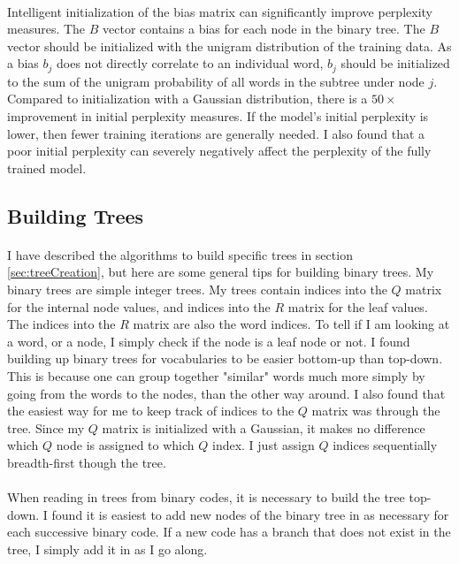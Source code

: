 \documentclass[12pt]{ociamthesis}  %
\begin{document}
\paragraph{}
Intelligent initialization of the bias matrix can significantly improve perplexity measures. The $B$ vector contains a bias for each node in the binary tree.  The $B$ vector should be initialized with the unigram distribution of the training data. As a bias $b_j$ does not directly correlate to an individual word, $b_j$ should be initialized to the sum of the unigram probability of all words in the subtree under node $j$.  Compared to initialization with a Gaussian distribution, there is a $50\times$ improvement in initial perplexity measures. If the model's initial perplexity is lower, then fewer training iterations are generally needed. I also found that a poor initial perplexity can severely negatively affect the perplexity of the fully trained model.

\subsection{Building Trees}
\paragraph{}
I have described the algorithms to build specific trees in section \ref{sec:treeCreation}, but here are some general tips for building binary trees. My binary trees are simple integer trees. My trees contain indices into the $Q$ matrix for the internal node values, and indices into the $R$ matrix for the leaf values. The indices into the $R$ matrix are also the word indices. To tell if I am looking at a word, or a node, I simply check if the node is a leaf node or not.  I found building up binary trees for vocabularies to be easier bottom-up than top-down. This is because one can group together "similar" words much more simply by going from the words to the nodes, than the other way around. I also found that the easiest way for me to keep track of indices to the $Q$ matrix was through the tree. Since my $Q$ matrix is initialized with a Gaussian, it makes no difference which $Q$ node is assigned to which $Q$ index. I just assign $Q$ indices sequentially breadth-first though the tree. 
\paragraph{}
When reading in trees from binary codes, it is necessary to build the tree top-down. I found it is easiest to add new nodes of the binary tree in as necessary for each successive binary code. If a new code has a branch that does not exist in the tree, I simply add it in as I go along.
\end{document}
